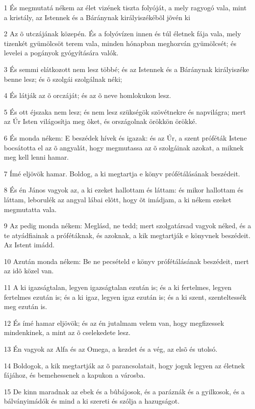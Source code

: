 \par 1 És megmutatá nékem az élet vizének tiszta folyóját, a mely ragyogó vala, mint a kristály, az Istennek és a Báránynak királyiszékébõl jõvén ki
\par 2 Az õ utczájának közepén. És a folyóvízen innen és túl életnek fája vala, mely tizenkét gyümölcsöt terem vala, minden hónapban meghozván gyümölcsét; és levelei  a pogányok gyógyítására valók.
\par 3 És semmi elátkozott nem lesz többé; és az Istennek és a Báránynak királyiszéke benne lesz; és õ szolgái szolgálnak néki;
\par 4 És látják az õ orczáját; és az õ neve  homlokukon lesz.
\par 5 És ott éjszaka nem lesz; és nem lesz szükségök szövétnekre és napvilágra; mert az Úr Isten világosítja meg õket, és országolnak örökkön örökké.
\par 6 És monda nékem: E beszédek hívek és igazak: és az Úr, a szent próféták Istene bocsátotta el az õ angyalát, hogy  megmutassa az õ szolgáinak azokat, a miknek meg kell lenni hamar.
\par 7 Ímé eljövök hamar. Boldog, a ki megtartja e könyv  prófétálásának beszédeit.
\par 8 És én János vagyok az, a ki ezeket hallottam és láttam: és mikor hallottam és láttam, leborulék az angyal lábai elõtt, hogy õt imádjam, a ki nékem ezeket megmutatta vala.
\par 9 Az pedig monda nékem: Meglásd, ne tedd; mert szolgatársad vagyok néked, és a te atyádfiainak a prófétáknak, és azoknak, a kik megtartják e könyvnek beszédeit. Az Istent imádd.
\par 10 Azután monda nékem: Be ne pecsételd e könyv prófétálásának beszédeit, mert az idõ  közel van.
\par 11 A ki igazságtalan, legyen igazságtalan ezután is; és a ki fertelmes, legyen fertelmes ezután is; és a ki igaz, legyen igaz ezután is; és a ki szent, szenteltessék meg ezután is.
\par 12 És ímé hamar eljövök; és az én jutalmam velem van, hogy megfizessek mindenkinek, a mint az õ cselekedete lesz.
\par 13 Én vagyok az Alfa és az Omega, a kezdet és a vég, az elsõ  és utolsó.
\par 14 Boldogok, a kik megtartják az õ parancsolatait, hogy joguk legyen az életnek fájához, és bemehessenek a kapukon  a városba.
\par 15 De kinn maradnak az ebek és a bûbájosok, és a paráznák és a gyilkosok, és a bálványimádók és mind a ki szereti és szólja a hazugságot.
